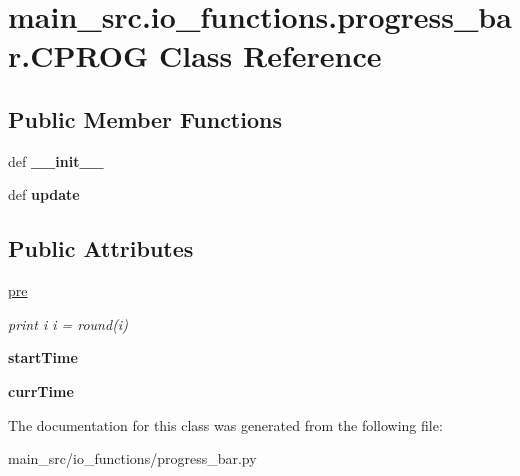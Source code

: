 \hypertarget{classmain__src_1_1io__functions_1_1progress__bar_1_1CPROG}{\section{main\-\_\-src.\-io\-\_\-functions.\-progress\-\_\-bar.\-C\-P\-R\-O\-G Class Reference}
\label{classmain__src_1_1io__functions_1_1progress__bar_1_1CPROG}
}
\subsection*{Public Member Functions}
\begin{DoxyCompactItemize}
\item 
\hypertarget{classmain__src_1_1io__functions_1_1progress__bar_1_1CPROG_a62bd5db8ffff026cdabfed38e47d9780}{def {\bfseries \-\_\-\-\_\-init\-\_\-\-\_\-}}\label{classmain__src_1_1io__functions_1_1progress__bar_1_1CPROG_a62bd5db8ffff026cdabfed38e47d9780}

\item 
\hypertarget{classmain__src_1_1io__functions_1_1progress__bar_1_1CPROG_a10d2e2c117d9888d43d1bef84b4378b6}{def {\bfseries update}}\label{classmain__src_1_1io__functions_1_1progress__bar_1_1CPROG_a10d2e2c117d9888d43d1bef84b4378b6}

\end{DoxyCompactItemize}
\subsection*{Public Attributes}
\begin{DoxyCompactItemize}
\item 
\hypertarget{classmain__src_1_1io__functions_1_1progress__bar_1_1CPROG_a9f527001b4d4ccba1d0cc05ee4df3f0a}{\hyperlink{classmain__src_1_1io__functions_1_1progress__bar_1_1CPROG_a9f527001b4d4ccba1d0cc05ee4df3f0a}{pre}}\label{classmain__src_1_1io__functions_1_1progress__bar_1_1CPROG_a9f527001b4d4ccba1d0cc05ee4df3f0a}

\begin{DoxyCompactList}\small\item\em print i i = round(i) \end{DoxyCompactList}\item 
\hypertarget{classmain__src_1_1io__functions_1_1progress__bar_1_1CPROG_a5207c53de4ed2289a86e54e515e3ec4d}{{\bfseries start\-Time}}\label{classmain__src_1_1io__functions_1_1progress__bar_1_1CPROG_a5207c53de4ed2289a86e54e515e3ec4d}

\item 
\hypertarget{classmain__src_1_1io__functions_1_1progress__bar_1_1CPROG_af0570f8304b8ec99027872253a23bdd0}{{\bfseries curr\-Time}}\label{classmain__src_1_1io__functions_1_1progress__bar_1_1CPROG_af0570f8304b8ec99027872253a23bdd0}

\end{DoxyCompactItemize}


The documentation for this class was generated from the following file\-:\begin{DoxyCompactItemize}
\item 
main\-\_\-src/io\-\_\-functions/progress\-\_\-bar.\-py\end{DoxyCompactItemize}
